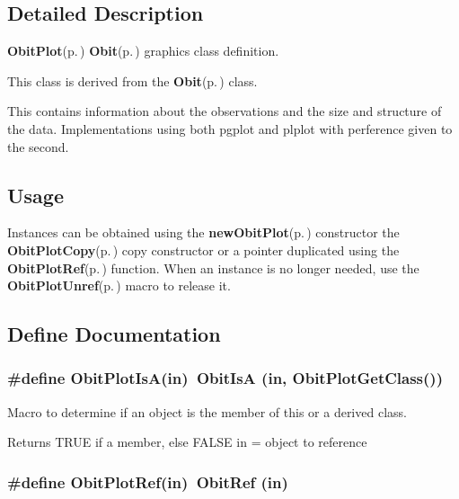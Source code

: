 \subsection{Detailed Description}
{\bf Obit\-Plot}{\rm (p.\,\pageref{structObitPlot})} {\bf Obit}{\rm (p.\,\pageref{structObit})} graphics class definition. 

This class is derived from the {\bf Obit}{\rm (p.\,\pageref{structObit})} class.

This contains information about the observations and the size and structure of the data. Implementations using both pgplot and plplot with perference given to the second.\subsection{Usage}\label{ObitPlot_8h_ObitPlotUsage}
Instances can be obtained using the {\bf new\-Obit\-Plot}{\rm (p.\,\pageref{ObitPlot_8c_a6})} constructor the {\bf Obit\-Plot\-Copy}{\rm (p.\,\pageref{ObitPlot_8c_a9})} copy constructor or a pointer duplicated using the {\bf Obit\-Plot\-Ref}{\rm (p.\,\pageref{ObitPlot_8h_a1})} function. When an instance is no longer needed, use the {\bf Obit\-Plot\-Unref}{\rm (p.\,\pageref{ObitPlot_8h_a0})} macro to release it.

\subsection{Define Documentation}
\subsubsection{\setlength{\rightskip}{0pt plus 5cm}\#define Obit\-Plot\-Is\-A(in)\ Obit\-Is\-A (in, Obit\-Plot\-Get\-Class())}\label{ObitPlot_8h_a2}


Macro to determine if an object is the member of this or a derived class. 

Returns TRUE if a member, else FALSE in = object to reference 
\subsubsection{\setlength{\rightskip}{0pt plus 5cm}\#define Obit\-Plot\-Ref(in)\ Obit\-Ref (in)}\label{ObitPlot_8h_a1}


